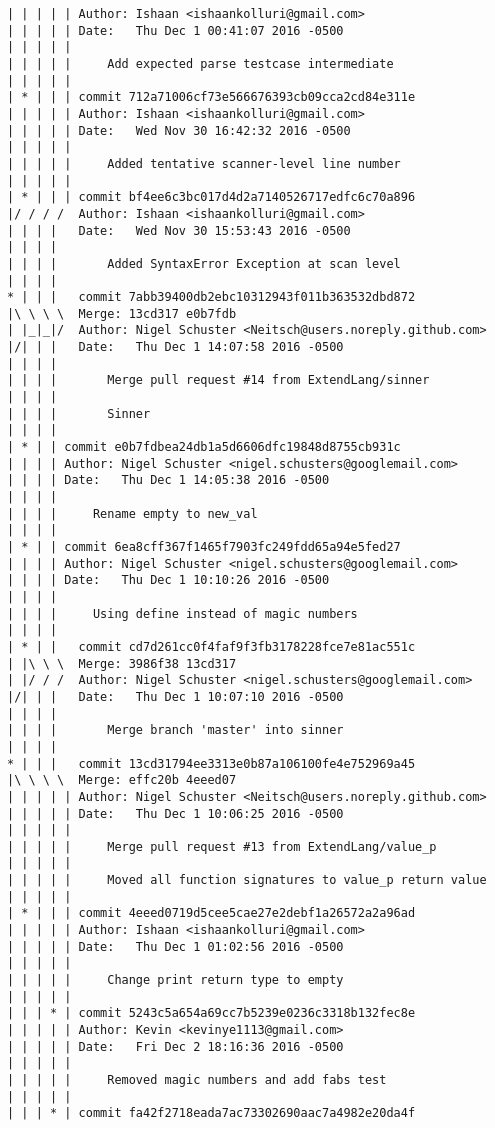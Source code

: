 \begin{lstlisting}
| | | | | Author: Ishaan <ishaankolluri@gmail.com>
| | | | | Date:   Thu Dec 1 00:41:07 2016 -0500
| | | | | 
| | | | |     Add expected parse testcase intermediate
| | | | |      
| * | | | commit 712a71006cf73e566676393cb09cca2cd84e311e
| | | | | Author: Ishaan <ishaankolluri@gmail.com>
| | | | | Date:   Wed Nov 30 16:42:32 2016 -0500
| | | | | 
| | | | |     Added tentative scanner-level line number
| | | | |      
| * | | | commit bf4ee6c3bc017d4d2a7140526717edfc6c70a896
|/ / / /  Author: Ishaan <ishaankolluri@gmail.com>
| | | |   Date:   Wed Nov 30 15:53:43 2016 -0500
| | | |   
| | | |       Added SyntaxError Exception at scan level
| | | |       
* | | |   commit 7abb39400db2ebc10312943f011b363532dbd872
|\ \ \ \  Merge: 13cd317 e0b7fdb
| |_|_|/  Author: Nigel Schuster <Neitsch@users.noreply.github.com>
|/| | |   Date:   Thu Dec 1 14:07:58 2016 -0500
| | | |   
| | | |       Merge pull request #14 from ExtendLang/sinner
| | | |       
| | | |       Sinner
| | | |     
| * | | commit e0b7fdbea24db1a5d6606dfc19848d8755cb931c
| | | | Author: Nigel Schuster <nigel.schusters@googlemail.com>
| | | | Date:   Thu Dec 1 14:05:38 2016 -0500
| | | | 
| | | |     Rename empty to new_val
| | | |     
| * | | commit 6ea8cff367f1465f7903fc249fdd65a94e5fed27
| | | | Author: Nigel Schuster <nigel.schusters@googlemail.com>
| | | | Date:   Thu Dec 1 10:10:26 2016 -0500
| | | | 
| | | |     Using define instead of magic numbers
| | | |       
| * | |   commit cd7d261cc0f4faf9f3fb3178228fce7e81ac551c
| |\ \ \  Merge: 3986f38 13cd317
| |/ / /  Author: Nigel Schuster <nigel.schusters@googlemail.com>
|/| | |   Date:   Thu Dec 1 10:07:10 2016 -0500
| | | |   
| | | |       Merge branch 'master' into sinner
| | | |       
* | | |   commit 13cd31794ee3313e0b87a106100fe4e752969a45
|\ \ \ \  Merge: effc20b 4eeed07
| | | | | Author: Nigel Schuster <Neitsch@users.noreply.github.com>
| | | | | Date:   Thu Dec 1 10:06:25 2016 -0500
| | | | | 
| | | | |     Merge pull request #13 from ExtendLang/value_p
| | | | |     
| | | | |     Moved all function signatures to value_p return value
| | | | |      
| * | | | commit 4eeed0719d5cee5cae27e2debf1a26572a2a96ad
| | | | | Author: Ishaan <ishaankolluri@gmail.com>
| | | | | Date:   Thu Dec 1 01:02:56 2016 -0500
| | | | | 
| | | | |     Change print return type to empty
| | | | |      
| | | * | commit 5243c5a654a69cc7b5239e0236c3318b132fec8e
| | | | | Author: Kevin <kevinye1113@gmail.com>
| | | | | Date:   Fri Dec 2 18:16:36 2016 -0500
| | | | | 
| | | | |     Removed magic numbers and add fabs test
| | | | |      
| | | * | commit fa42f2718eada7ac73302690aac7a4982e20da4f

\end{lstlisting}

